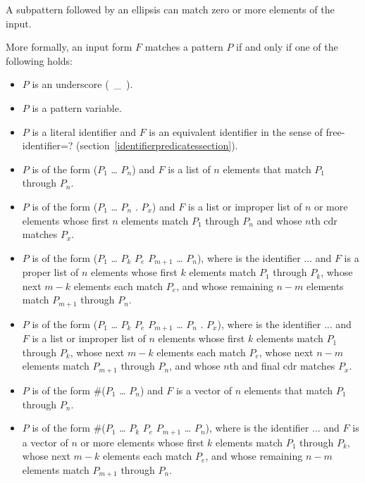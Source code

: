 \begin{entry}{%
}
A subpattern followed by an ellipsis can match zero or more elements of
the input.

More formally, an input form $F$ matches a pattern $P$ if and only if
one of the following holds:

\begin{itemize}
\item $P$ is an underscore (~{\cf \_}~).

\item $P$ is a pattern variable.

\item $P$ is a literal identifier
and $F$ is an equivalent identifier in the
sense of {\cf free-identifier=?}
(section~\ref{identifierpredicatessection}).

\item $P$ is of the form
{\cf ($P_1$ \dots{} $P_n$)}
and $F$ is a list of $n$ elements that match $P_1$ through
$P_n$.

\item $P$ is of the form
{\cf ($P_1$ \dots{} $P_n$ . $P_x$)}
and $F$ is a list or improper list of $n$ or more elements
whose first $n$ elements match $P_1$ through $P_n$
and
whose $n$th cdr matches $P_x$.

\item $P$ is of the form
{\cf ($P_1$ \dots{} $P_k$ $P_e$  $P_{m+1}$ \dots{} $P_n$)},
where  is the identifier {\cf ...}
and $F$ is a proper list of $n$
elements whose first $k$ elements match $P_1$ through $P_k$,
whose next $m-k$ elements each match $P_e$,
and
whose remaining $n-m$ elements match $P_{m+1}$ through $P_n$.

\item $P$ is of the form
{\cf ($P_1$ \dots{} $P_k$ $P_e$  $P_{m+1}$ \dots{} $P_n$ . $P_x$)},
where  is the identifier {\cf ...}
and $F$ is a list or improper list of $n$
elements whose first $k$ elements match $P_1$ through $P_k$,
whose next $m-k$ elements each match $P_e$,
whose next $n-m$ elements match $P_{m+1}$ through $P_n$,
and 
whose $n$th and final cdr matches $P_x$.

\item $P$ is of the form
{\cf \#($P_1$ \dots{} $P_n$)}
and $F$ is a vector of $n$ elements that match $P_1$ through
$P_n$.

\item $P$ is of the form
{\cf \#($P_1$ \dots{} $P_k$ $P_e$  $P_{m+1}$ \dots{} $P_n$)},
where  is the identifier {\cf ...}
and $F$ is a vector of $n$ or more elements
whose first $k$ elements match $P_1$ through $P_k$,
whose next $m-k$ elements each match $P_e$,
and
whose remaining $n-m$ elements match $P_{m+1}$ through $P_n$.


\end{itemize}
\end{entry}
